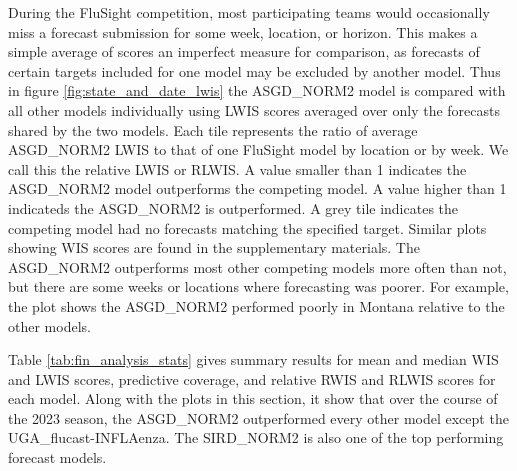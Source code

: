 During the FluSight competition, most participating teams would occasionally 
miss a forecast submission for some week, location, or horizon. This makes a 
simple average of scores an imperfect measure for comparison, as forecasts
of certain targets included for one model may be excluded by another model.
Thus in figure \ref{fig:state_and_date_lwis} 
the ASGD\_NORM2 model is compared with all 
other models individually using LWIS scores averaged over only the 
forecasts shared by the two models.
Each tile represents the ratio of average ASGD\_NORM2
LWIS to that of one FluSight model by location or by week.
We call this the relative LWIS or RLWIS. A value smaller than
1 indicates the ASGD\_NORM2 model outperforms the competing model. A value 
higher than 1 indicateds the ASGD\_NORM2 is outperformed. A grey tile indicates
the competing model had no forecasts matching the specified target.
Similar plots showing WIS scores are found in the supplementary materials. 
The ASGD\_NORM2 outperforms most other competing models more often than not, but
there are some weeks or locations where forecasting was poorer. For example, 
the plot shows the ASGD\_NORM2 performed poorly in Montana relative to the other
models.

Table \ref{tab:fin_analysis_stats} gives summary results for mean and median
WIS and LWIS scores, predictive coverage, and relative RWIS and RLWIS scores
for each model. Along with the plots in this section, it 
show that over the course of the 
2023 season, 
the ASGD\_NORM2 outperformed every other model except the 
UGA\_flucast-INFLAenza. The SIRD\_NORM2 is also one of the top performing 
forecast models.
 



